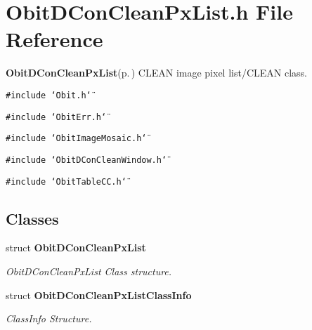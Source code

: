 \section{Obit\-DCon\-Clean\-Px\-List.h File Reference}
\label{ObitDConCleanPxList_8h}
{\bf Obit\-DCon\-Clean\-Px\-List}{\rm (p.\,\pageref{structObitDConCleanPxList})} CLEAN image pixel list/CLEAN class. 

{\tt \#include \char`\"{}Obit.h\char`\"{}}\par
{\tt \#include \char`\"{}Obit\-Err.h\char`\"{}}\par
{\tt \#include \char`\"{}Obit\-Image\-Mosaic.h\char`\"{}}\par
{\tt \#include \char`\"{}Obit\-DCon\-Clean\-Window.h\char`\"{}}\par
{\tt \#include \char`\"{}Obit\-Table\-CC.h\char`\"{}}\par
\subsection*{Classes}
\begin{CompactItemize}
\item 
struct {\bf Obit\-DCon\-Clean\-Px\-List}
\begin{CompactList}\small\item\em Obit\-DCon\-Clean\-Px\-List Class structure. \item\end{CompactList}\item 
struct {\bf Obit\-DCon\-Clean\-Px\-List\-Class\-Info}
\begin{CompactList}\small\item\em Class\-Info Structure. \item\end{CompactList}\end{CompactItemize}
